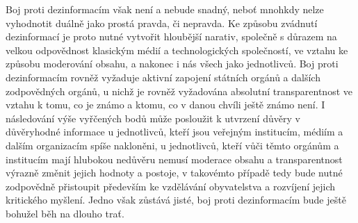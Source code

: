 Boj proti dezinformacím však není a nebude snadný, neboť mnohkdy nelze vyhodnotit duálně jako prostá pravda, či nepravda. Ke způsobu zvádnutí dezinformací je proto nutné vytvořit hloubější narativ, společně s důrazem na velkou odpovědnost klasickým médií a technologických společností, ve vztahu ke způsobu moderování obsahu, a nakonec i nás všech jako jednotlivců. Boj proti dezinformacím rovněž vyžaduje aktivní zapojení státních orgánů a dalších zodpovědných orgánů, u nichž je rovněž vyžadována absolutní transparentnost ve vztahu k tomu, co je známo a ktomu, co v danou chvíli ještě známo není. I následování výše vyřčených bodů může posloužit k utvrzení důvěry v důvěryhodné informace u jednotlivců, kteří jsou veřejným institucím, médiím a dalším organizacím spíše nakloněni, u jednotlivců, kteří vůči těmto orgánům a institucím mají hlubokou nedůvěru nemusí moderace obsahu a transparentnost výrazně změnit jejich hodnoty a postoje, v takovémto případě tedy bude nutné zodpovědně přistoupit především ke vzdělávání obyvatelstva a rozvíjení jejich kritického myšlení. Jedno však zůstává jisté, boj proti dezinformacím bude ještě bohužel běh na dlouho trať.